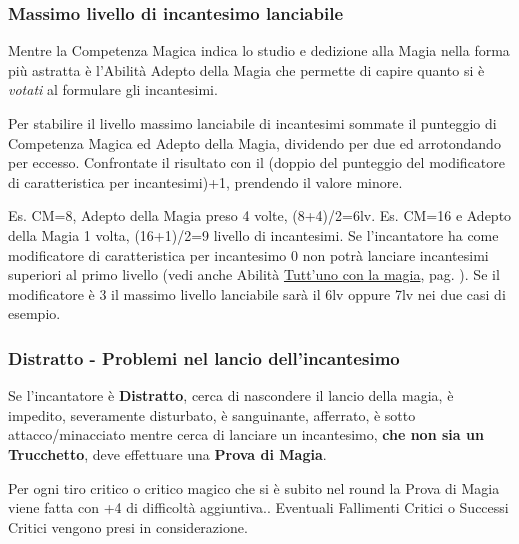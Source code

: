 \begin{multicols}{2}

\subsubsection{Massimo livello di incantesimo lanciabile}\hypertarget{scuoleelivelli}{}\label{magieaccessoallelistedimagia}\label{scuoleelivelli}

Mentre la Competenza Magica indica lo studio e dedizione alla Magia nella forma più astratta è l'Abilità Adepto della Magia che permette di capire quanto si è \emph{votati} al formulare gli incantesimi.

Per stabilire il livello massimo lanciabile di incantesimi sommate il punteggio di Competenza Magica ed Adepto della Magia, dividendo per due ed arrotondando per eccesso. Confrontate il risultato con il (doppio del punteggio del modificatore di caratteristica per incantesimi)+1, prendendo il valore minore.

Es. CM=8, Adepto della Magia preso 4 volte, (8+4)/2=6lv. Es. CM=16 e Adepto della Magia 1 volta, (16+1)/2=9 livello di incantesimi.
Se l'incantatore ha come modificatore di caratteristica per incantesimo 0 non potrà lanciare incantesimi superiori al primo livello (vedi anche Abilità \hyperlink{Tutt'uno con la magia}{Tutt'uno con la magia}, pag. \pageref{Tutt'uno con la magia}).
Se il modificatore è 3 il massimo livello lanciabile sarà il 6lv oppure 7lv nei due casi di esempio.

\subsubsection{Distratto - Problemi nel lancio dell'incantesimo}\label{magiedistratto}

Se l'incantatore è \textbf{Distratto}, cerca di nascondere il lancio della magia, è impedito, severamente disturbato, è sanguinante, afferrato, è sotto attacco/minacciato mentre cerca di lanciare un incantesimo, \textbf{che non sia un Trucchetto}, deve effettuare una \textbf{Prova di Magia}.

Per ogni tiro critico o critico magico che si è subito nel round la Prova di Magia viene fatta con +4 di difficoltà aggiuntiva.. Eventuali Fallimenti Critici o Successi Critici vengono presi in considerazione.


\end{multicols}
